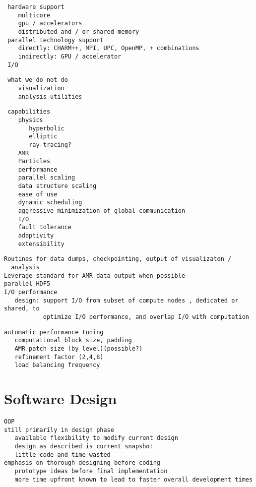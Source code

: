 \documentclass[14pt,letter]{article}
\begin{document}
\begin{verbatim}
 hardware support
    multicore
    gpu / accelerators
    distributed and / or shared memory
 parallel technology support
    directly: CHARM++, MPI, UPC, OpenMP, + combinations
    indirectly: GPU / accelerator
 I/O
\end{verbatim}

\begin{verbatim}
 what we do not do
    visualization
    analysis utilities
\end{verbatim}

\begin{verbatim}
 capabilities
    physics
       hyperbolic
       elliptic
       ray-tracing?
    AMR
    Particles
    performance
    parallel scaling
    data structure scaling
    ease of use
    dynamic scheduling
    aggressive minimization of global communication
    I/O
    fault tolerance
    adaptivity
    extensibility
\end{verbatim}

\begin{verbatim}
Routines for data dumps, checkpointing, output of visualizaton /
  analysis
Leverage standard for AMR data output when possible
parallel HDF5
I/O performance
   design: support I/O from subset of compute nodes , dedicated or shared, to
           optimize I/O performance, and overlap I/O with computation
\end{verbatim}

\begin{verbatim}
automatic performance tuning
   computational block size, padding
   AMR patch size (by level)(possible?)
   refinement factor (2,4,8)
   load balancing frequency
\end{verbatim}

\section{Software Design} \label{s:design}


\begin{verbatim}
OOP
still primarily in design phase
   available flexibility to modify current design
   design as described is current snapshot
   little code and time wasted
emphasis on thorough designing before coding
   prototype ideas before final implementation
   more time upfront known to lead to faster overall development times
\end{verbatim}
\end{document}
